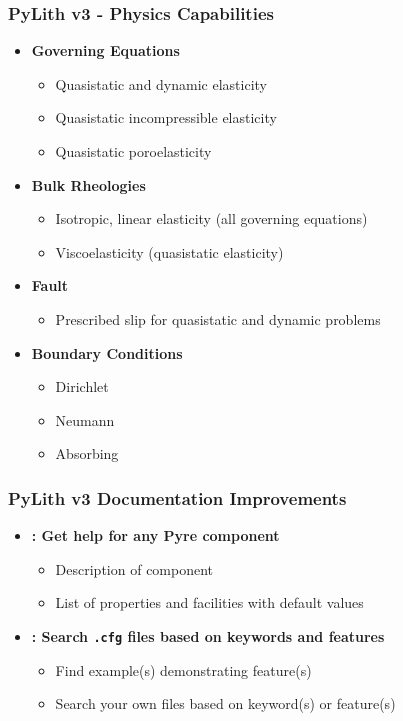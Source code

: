 \documentclass[aspectratio=169]{beamer}
\newcommand{\highlight}[1]{{\bf\color{green}#1}}
\begin{document}
\begin{frame}
  \frametitle{PyLith v3 - Physics Capabilities}

  \begin{itemize}
  \item \highlight{Governing Equations}
    \begin{itemize}
    \item Quasistatic and dynamic elasticity
    \item Quasistatic incompressible elasticity
    \item Quasistatic poroelasticity
    \end{itemize}
  \item \highlight{Bulk Rheologies}
    \begin{itemize}
    \item Isotropic, linear elasticity (all governing equations)
    \item Viscoelasticity (quasistatic elasticity)
    \end{itemize}
  \item \highlight{Fault}
    \begin{itemize}
    \item Prescribed slip for quasistatic and dynamic problems
    \end{itemize}
  \item \highlight{Boundary Conditions}
    \begin{itemize}
    \item Dirichlet
    \item Neumann
    \item Absorbing
    \end{itemize}
  \end{itemize}
  
\end{frame}


\begin{frame}
  \frametitle{PyLith v3 Documentation Improvements}
  \summary{}

  \begin{itemize}
  \item \highlight{{\tt pyre\_doc}: Get help for any Pyre component}\\
    \begin{itemize}
    \item Description of component
    \item List of properties and facilities with default values
    \end{itemize}
  \item \highlight{{\tt pylith\_cfgsearch}: Search {\tt .cfg} files based on keywords and features}
    \begin{itemize}
    \item Find example(s) demonstrating feature(s)
    \item Search your own files based on keyword(s) or feature(s)
    \end{itemize}
  \end{itemize}
  
\end{frame}
\end{document}
